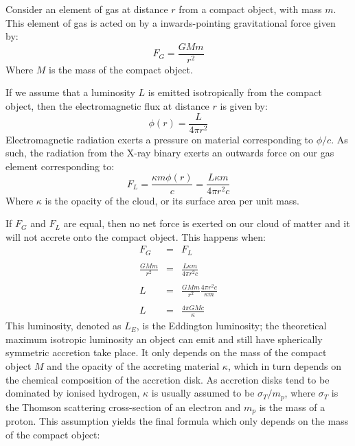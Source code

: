 \par{} Consider an element of gas at distance $r$ from a compact object, with mass $m$.  This element of gas is acted on by a inwards-pointing gravitational force given by:
\begin{equation}
F_G=\frac{GMm}{r^2}
\end{equation}
Where $M$ is the mass of the compact object.
\par If we assume that a luminosity $L$ is emitted isotropically from the compact object, then the electromagnetic flux at distance $r$ is given by:
\begin{equation}
\phi(r)=\frac{L}{4\pi r^2}
\end{equation}
Electromagnetic radiation exerts a pressure on material corresponding to $\phi/c$.  As such, the radiation from the X-ray binary exerts an outwards force on our gas element corresponding to:
\begin{equation}
F_L=\frac{\kappa m\phi(r)}{c}=\frac{L\kappa m}{4\pi r^2c}
\end{equation}
Where $\kappa$ is the opacity of the cloud, or its surface area per unit mass.
\par If $F_G$ and $F_L$ are equal, then no net force is exerted on our cloud of matter and it will not accrete onto the compact object.  This happens when:
\begin{eqnarray}
F_G&=&F_L\\ \nonumber \\
\frac{GMm}{r^2}&=&\frac{L\kappa m}{4\pi r^2c} \\ \nonumber \\
L&=&\frac{GMm}{r^2}\frac{4\pi r^2c}{\kappa m} \\ \nonumber \\
L&=&\frac{4\pi GMc}{\kappa}
\end{eqnarray}
This luminosity, denoted as $L_E$, is the Eddington luminosity; the theoretical maximum isotropic luminosity an object can emit and still have spherically symmetric accretion take place.  It only depends on the mass of the compact object $M$ and the opacity of the accreting material $\kappa$, which in turn depends on the chemical composition of the accretion disk.  As accretion disks tend to be dominated by ionised hydrogen, $\kappa$ is usually assumed to be $\sigma_T/m_p$, where $\sigma_T$ is the Thomson scattering cross-section of an electron and $m_p$ is the mass of a proton.  This assumption yields the final formula which only depends on the mass of the compact object:

